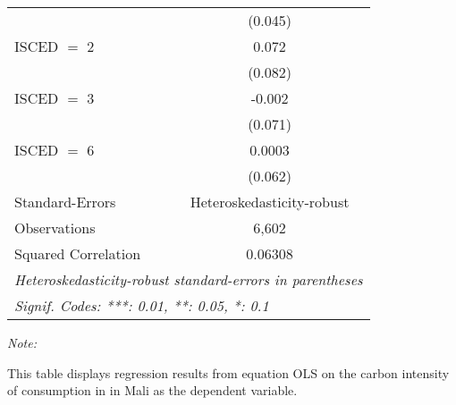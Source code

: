 \begin{table}[htbp!]
\begin{adjustbox}{width = 1\textwidth, max height = 0.95\textheight, center}
\begin{threeparttable}[b]
\begin{tabular}{lc}
                                & (0.045)\\   
            ISCED $=$ 2         & 0.072\\   
                                & (0.082)\\   
            ISCED $=$ 3         & -0.002\\   
                                & (0.071)\\   
            ISCED $=$ 6         & 0.0003\\   
                                & (0.062)\\   
            \midrule 
            Standard-Errors     & Heteroskedasticity-robust \\   
            Observations        & 6,602\\  
            Squared Correlation & 0.06308\\  
            \midrule \midrule
            \multicolumn{2}{l}{\emph{Heteroskedasticity-robust standard-errors in parentheses}}\\
            \multicolumn{2}{l}{\emph{Signif. Codes: ***: 0.01, **: 0.05, *: 0.1}}\\
         \end{tabular}
         
         \begin{tablenotes}\item \medskip \textit{Note:}
            \item This table displays regression results from equation OLS on the carbon intensity of consumption in  in Mali as the dependent variable. 
         \end{tablenotes}
      \end{threeparttable}
   \end{adjustbox}
\end{table}



